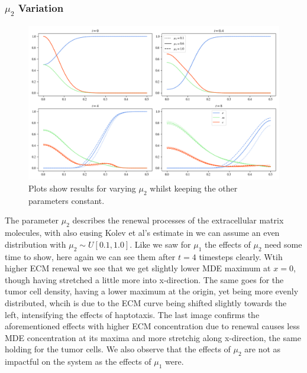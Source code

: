 \subsubsection*{$\mu_2$ Variation}
\begin{figure}[h]
    \centering
    \includegraphics[width=\textwidth]{resources/images/prolif_mu_2_variation.png}
    \caption{Plots show results for varying $\mu_2$ whilst keeping the other parameters constant.}
    \label{fig:prolif_mu_2_variation}
\end{figure}

The parameter $\mu_2$ describes the renewal processes of the extracellular matrix molecules, with also eusing Kolev et al's estimate in \cite{Kolev2010} we can assume an even distribution with $\mu_2 \sim U[0.1, 1.0]$.\newline 
Like we saw for $\mu_1$ the effects of $\mu_2$ need some time to show, here again we can see them after $t=4$ timesteps clearly. Wtih higher ECM renewal we see that we get slightly lower MDE maximum at $x=0$, though having stretched a little more into x-direction. The same goes for the tumor cell density, having a lower maximum at the origin, yet being more evenly distributed, whcih is due to the ECM curve being shifted slightly towards the left, intensifying the effects of haptotaxis. The last image confirms the aforementioned effects with higher ECM concentration due to renewal causes less MDE concentration at its maxima and more stretchig along x-direction, the same holding for the tumor cells. We also observe that the effects of $\mu_2$ are not as impactful on the system as the effects of $\mu_1$ were.

